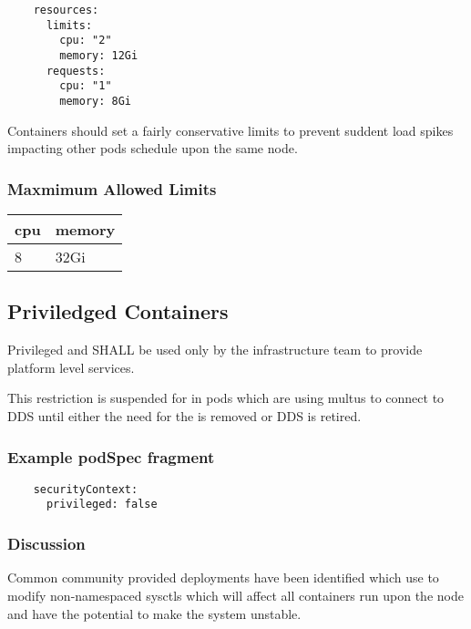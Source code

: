 \documentclass[PMO,authoryear,toc]{lsstdoc}
\begin{document}
\begin{verbatim}
    resources:
      limits:
        cpu: "2"
        memory: 12Gi
      requests:
        cpu: "1"
        memory: 8Gi
\end{verbatim}

Containers should set a fairly conservative limits to prevent suddent load spikes impacting other pods schedule upon the same node.

\subsubsection{Maxmimum Allowed Limits}

\begin{center}
\begin{tabular}{|l|l|}
\hline
    \bf cpu & \bf memory \\ \hline
    8 & 32Gi \\ \hline
\end{tabular}
\end{center}

\subsection{Priviledged Containers}

Privileged  and  SHALL be used only by the infrastructure team to provide platform level services.

This restriction is suspended for  in pods which are using multus to connect to DDS until either the need for the  is removed or DDS is retired.

\subsubsection{Example podSpec fragment}

\begin{verbatim}
    securityContext:
      privileged: false
\end{verbatim}

\subsubsection{Discussion}

Common community provided deployments have been identified which use  to modify non-namespaced sysctls which will affect all containers run upon the node and have the potential to make the system unstable.
\end{document}
